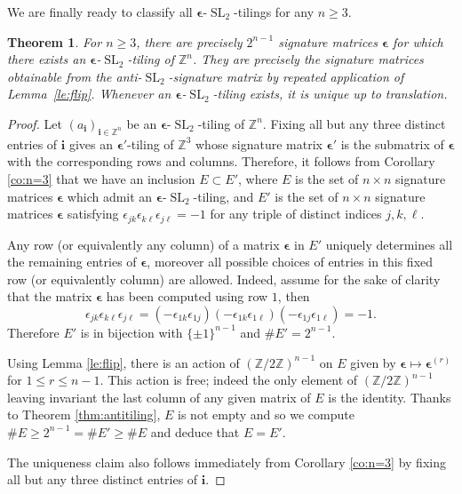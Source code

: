 \documentclass[12pt]{amsart}
\newtheorem{theorem}{Theorem}
\newcommand{\bepsilon}{\boldsymbol{\epsilon}}
\newcommand{\bi}{\boldsymbol{i}}
\newcommand{\SL}{\operatorname{SL}}
\newcommand{\ZZ}{\mathbb{Z}}
\begin{document}
  We are finally ready to classify all $\bepsilon$-$\SL_2$-tilings for any $n\geq3$.
  \begin{theorem}
    \label{thm:classification}
    For $n\geq3$, there are precisely $2^{n-1}$ signature matrices $\bepsilon$ for which there exists an $\bepsilon$-$\SL_2$-tiling of $\ZZ^n$.
    They are precisely the signature matrices obtainable from the anti-$\SL_2$-signature matrix by repeated application of Lemma~\ref{le:flip}.
    Whenever an $\bepsilon$-$\SL_2$-tiling exists, it is unique up to translation.
  \end{theorem}
  \begin{proof}
    Let $(a_{\bi})_{\bi\in\ZZ^n}$ be an $\bepsilon$-$\SL_2$-tiling of $\ZZ^n$.
    Fixing all but any three distinct entries of $\bi$ gives an $\bepsilon'$-tiling of $\ZZ^3$ whose signature matrix $\bepsilon'$ is the submatrix of $\bepsilon$ with the corresponding rows and columns.
    Therefore, it follows from Corollary \ref{co:n=3} that we have an inclusion $E \subset E'$, where $E$ is the set of $n\times n$ signature matrices $\bepsilon$ which admit an $\bepsilon$-$\SL_2$-tiling, and $E'$ is the set of $n\times n$ signature matrices $\bepsilon$ satisfying $\epsilon_{jk} \epsilon_{k\ell} \epsilon_{j\ell} = -1$ for any triple of distinct indices $j,k,\ell$.

    Any row (or equivalently any column) of a matrix $\bepsilon$ in $E'$ uniquely determines all the remaining entries of $\bepsilon$, moreover all possible choices of entries in this fixed row (or equivalently column) are allowed.
    Indeed, assume for the sake of clarity that the matrix $\bepsilon$ has been computed using row $1$, then
    \[
      \epsilon_{jk} \epsilon_{k\ell} \epsilon_{j\ell} = (-\epsilon_{1k}\epsilon_{1j})(-\epsilon_{1k}\epsilon_{1\ell})(-\epsilon_{1j}\epsilon_{1\ell})=-1.
    \]
    Therefore $E'$ is in bijection with $\{\pm 1\}^{n-1}$ and $\#E'= 2^{n-1}$.

    Using Lemma \ref{le:flip}, there is an action of $(\ZZ/2\ZZ)^{n-1}$ on $E$ given by $\bepsilon \mapsto \bepsilon^{(r)}$ for $1 \leq r \leq n-1$.
    This action is free; indeed the only element of $(\ZZ/2\ZZ)^{n-1}$ leaving invariant the last column of any given matrix of $E$ is the identity.
    Thanks to Theorem \ref{thm:antitiling}, $E$ is not empty and so we compute $\#E \geq 2^{n-1} = \# E' \geq \#E$ and deduce that $E = E'$.

    The uniqueness claim also follows immediately from Corollary \ref{co:n=3} by fixing all but any three distinct entries of $\bi$.

  \end{proof}
\end{document}
